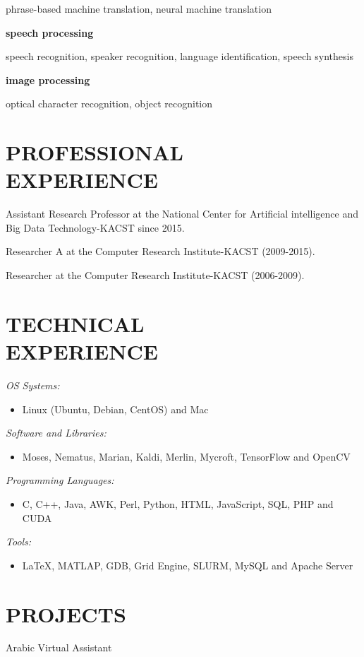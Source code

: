 \documentclass[margin,a4paper]{res}
\begin{document}
\begin{resume}
phrase-based machine translation, neural machine translation

{\bf speech processing}

speech recognition, speaker recognition, language identification, speech synthesis
 
{\bf image processing}

optical character recognition, object recognition

\section{PROFESSIONAL\\EXPERIENCE} 
Assistant Research Professor at the National Center for Artificial intelligence and Big Data Technology-KACST since 2015.

Researcher A at the Computer Research Institute-KACST (2009-2015).

Researcher at the Computer Research Institute-KACST (2006-2009).

\section{TECHNICAL\\EXPERIENCE} {\sl OS Systems:}
				\begin{itemize}
				\item Linux (Ubuntu, Debian, CentOS) and Mac
				\end{itemize}

				{\sl Software and Libraries:}
				\begin{itemize}
				\item Moses, Nematus, Marian, Kaldi, Merlin, Mycroft, TensorFlow and OpenCV
				\end{itemize}

				{\sl Programming Languages:}
				\begin{itemize}
				\item C, C++, Java, AWK, Perl, Python, HTML, JavaScript, SQL, PHP and CUDA
				\end{itemize}

				{\sl Tools:}
				\begin{itemize}
		 		\item  LaTeX, MATLAP, GDB, Grid Engine, SLURM, MySQL and Apache Server
				\end{itemize}
\section{PROJECTS}
Arabic Virtual Assistant


\end{resume}
\end{document}
